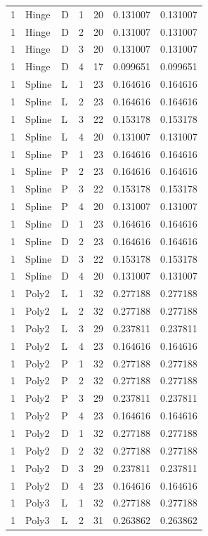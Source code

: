 \begin{longtable}{lllrrrr}
1 & Hinge & D & 1 & 20 & 0.131007 & 0.131007 \\
1 & Hinge & D & 2 & 20 & 0.131007 & 0.131007 \\
1 & Hinge & D & 3 & 20 & 0.131007 & 0.131007 \\
1 & Hinge & D & 4 & 17 & 0.099651 & 0.099651 \\
1 & Spline & L & 1 & 23 & 0.164616 & 0.164616 \\
1 & Spline & L & 2 & 23 & 0.164616 & 0.164616 \\
1 & Spline & L & 3 & 22 & 0.153178 & 0.153178 \\
1 & Spline & L & 4 & 20 & 0.131007 & 0.131007 \\
1 & Spline & P & 1 & 23 & 0.164616 & 0.164616 \\
1 & Spline & P & 2 & 23 & 0.164616 & 0.164616 \\
1 & Spline & P & 3 & 22 & 0.153178 & 0.153178 \\
1 & Spline & P & 4 & 20 & 0.131007 & 0.131007 \\
1 & Spline & D & 1 & 23 & 0.164616 & 0.164616 \\
1 & Spline & D & 2 & 23 & 0.164616 & 0.164616 \\
1 & Spline & D & 3 & 22 & 0.153178 & 0.153178 \\
1 & Spline & D & 4 & 20 & 0.131007 & 0.131007 \\
1 & Poly2 & L & 1 & 32 & 0.277188 & 0.277188 \\
1 & Poly2 & L & 2 & 32 & 0.277188 & 0.277188 \\
1 & Poly2 & L & 3 & 29 & 0.237811 & 0.237811 \\
1 & Poly2 & L & 4 & 23 & 0.164616 & 0.164616 \\
1 & Poly2 & P & 1 & 32 & 0.277188 & 0.277188 \\
1 & Poly2 & P & 2 & 32 & 0.277188 & 0.277188 \\
1 & Poly2 & P & 3 & 29 & 0.237811 & 0.237811 \\
1 & Poly2 & P & 4 & 23 & 0.164616 & 0.164616 \\
1 & Poly2 & D & 1 & 32 & 0.277188 & 0.277188 \\
1 & Poly2 & D & 2 & 32 & 0.277188 & 0.277188 \\
1 & Poly2 & D & 3 & 29 & 0.237811 & 0.237811 \\
1 & Poly2 & D & 4 & 23 & 0.164616 & 0.164616 \\
1 & Poly3 & L & 1 & 32 & 0.277188 & 0.277188 \\
1 & Poly3 & L & 2 & 31 & 0.263862 & 0.263862 \\

\end{longtable}
